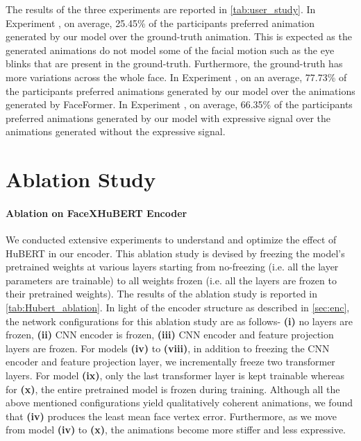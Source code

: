 \documentclass[10pt,twocolumn,letterpaper]{article}
\newcommand{\RNum}[1]{\uppercase\expandafter{\romannumeral #1\relax}}
\begin{document}
The results of the three experiments are reported in \cref{tab:user_study}. In Experiment \RNum{1}, on average, 25.45\% of the participants preferred animation generated by our model over the ground-truth animation. This is expected as the generated animations do not model some of the facial motion such as the eye blinks that are present in the ground-truth. Furthermore, the ground-truth has more variations across the whole face. In Experiment \RNum{2}, on an average, 77.73\% of the participants preferred animations generated by our model over the animations generated by FaceFormer. In Experiment \RNum{3}, on average, 66.35\% of the participants preferred animations generated by our model with expressive signal over the animations generated without the expressive signal. 


\section{Ablation Study}
\paragraph{Ablation on FaceXHuBERT Encoder}
\label{sec:ablation_hubert}
We conducted extensive experiments to understand and optimize the effect of HuBERT in our encoder. This ablation study is devised by freezing the model's pretrained weights at various layers starting from no-freezing (i.e. all the layer parameters are trainable) to all weights frozen (i.e. all the layers are frozen to their pretrained weights). The results of the ablation study is reported in \cref{tab:Hubert_ablation}. In light of the encoder structure as described in \cref{sec:enc}, the network configurations for this ablation study are as follows- \textbf{(i)} no layers are frozen, \textbf{(ii)} CNN encoder is frozen, \textbf{(iii)} CNN encoder and feature projection layers are frozen. For models \textbf{(iv)} to \textbf{(viii)}, in addition to freezing the CNN encoder and feature projection layer, we incrementally freeze two transformer layers. For model \textbf{(ix)}, only the last transformer layer is kept trainable whereas for \textbf{(x)}, the entire pretrained model is frozen during training. Although all the above mentioned configurations yield qualitatively coherent animations, we found that \textbf{(iv)} produces the least mean face vertex error. Furthermore, as we move from model \textbf{(iv)} to \textbf{(x)}, the animations become more stiffer and less expressive. 
\vspace{-1.5em}
\end{document}
